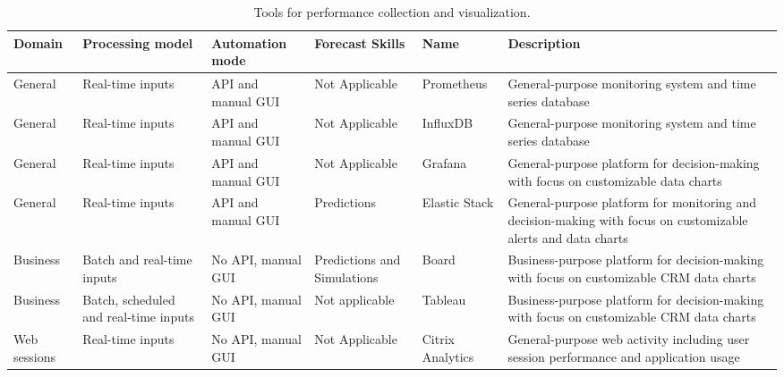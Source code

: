 \begin{table}[htp]
	\caption{Tools for performance collection and visualization.}
	\centering
	\label{tab:IEEECOMSTcollection}
	\def\arraystretch{1.2}%
	\setlength\tabcolsep{2.0pt} %
	{\scriptsize
		\begin{tabular}{>{\centering\arraybackslash}m{}
			>{\centering\arraybackslash}m{}
			>{\centering\arraybackslash}m{}
			>{\centering\arraybackslash}m{}
			>{\centering\arraybackslash}m{}
			>{\centering\arraybackslash}m{}
		}
		\toprule
		\textbf{Domain} & \textbf{Processing model} & \textbf{Automation mode} & \textbf{Forecast Skills} & \textbf{Name} & \textbf{Description} \\
		\midrule
		\midrule
		General & Real-time inputs & API and manual GUI & Not Applicable & Prometheus \cite{Prometheus} & General-purpose monitoring system and time series database \\
		General & Real-time inputs & API and manual GUI & Not Applicable & InfluxDB \cite{InfluxDB} & General-purpose monitoring system and time series database \\
		General & Real-time inputs & API and manual GUI & Not Applicable & Grafana \cite{Grafana} & General-purpose platform for decision-making with focus on customizable data charts \\
		General & Real-time inputs & API and manual GUI & Predictions & Elastic Stack \cite{ElasticStack} & General-purpose platform for monitoring and decision-making with focus on customizable alerts and data charts \\
		Business & Batch and real-time inputs & No API, manual GUI & Predictions and Simulations & Board \cite{Board} & Business-purpose platform for decision-making with focus on customizable CRM data charts \\
		Business & Batch, scheduled and real-time inputs & No API, manual GUI & Not applicable & Tableau \cite{Hoelscher2018} & Business-purpose platform for decision-making with focus on customizable CRM data charts \\
		Web sessions & Real-time inputs & No API, manual GUI & Not Applicable & Citrix Analytics \cite{Citrix} & General-purpose web activity including user session performance and application usage \\

\end{tabular}}
\end{table}
